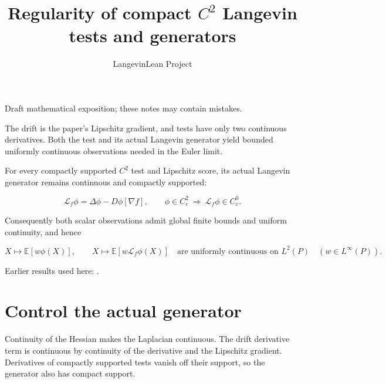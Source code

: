 \documentclass[11pt,a4paper]{article}
\title{\texorpdfstring{Regularity of compact \(C^{2}\) Langevin tests and generators}{Regularity of compact C² Langevin tests and generators}}
\author{LangevinLean Project}
\date{}
\begin{document}
\maketitle
Draft mathematical exposition; these notes may contain mistakes.


The drift is the paper's Lipschitz gradient, and tests have only two continuous derivatives. Both the test and its actual Langevin generator yield bounded uniformly continuous observations needed in the Euler limit.



For every compactly supported \(C^2\) test and Lipschitz score, its actual Langevin generator remains continuous and compactly supported:


\[\mathcal L_f\phi=\Delta\phi-D\phi[\nabla f],\qquad
\phi\in C_c^2\ \Longrightarrow\ \mathcal L_f\phi\in C_c^0.\]


Consequently both scalar observations admit global finite bounds and uniform continuity, and hence


\[X\longmapsto\mathbb E[w\phi(X)],\qquad
X\longmapsto\mathbb E[w\mathcal L_f\phi(X)]
\quad\text{are uniformly continuous on }L^2(P)
\quad (w\in L^\infty(P)).\]

Earlier results used here: \cite[Section~3.46]{LangevinLean2026ULASC}.

\section{\texorpdfstring{Control the actual generator}{Control the actual generator}}


Continuity of the Hessian makes the Laplacian continuous. The drift derivative term is continuous by continuity of the derivative and the Lipschitz gradient. Derivatives of compactly supported tests vanish off their support, so the generator also has compact support.
\end{document}
